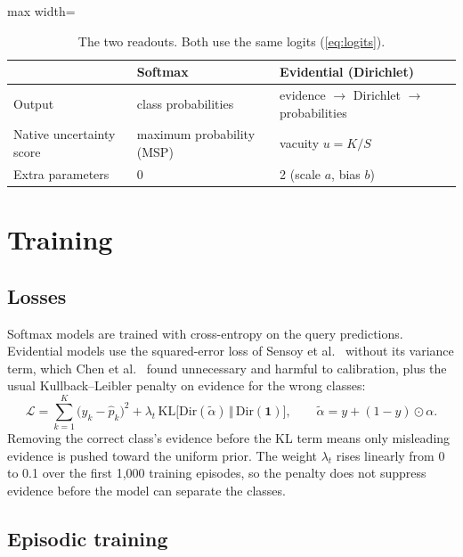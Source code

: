 \begin{table}[H]
\centering
\caption{The two readouts. Both use the same logits (\cref{eq:logits}).}
\label{tab:readouts}
\begin{adjustbox}{max width=\textwidth}
\begin{tabular}{@{}lll@{}}
\toprule
& Softmax & Evidential (Dirichlet) \\
\midrule
Output & class probabilities & evidence $\rightarrow$ Dirichlet $\rightarrow$ probabilities \\
Native uncertainty score & maximum probability (MSP) & vacuity $u = K/S$ \\
Extra parameters & 0 & 2 (scale $a$, bias $b$) \\
\bottomrule
\end{tabular}
\end{adjustbox}
\end{table}

\section{Training}
\label{sec:training}

\subsection{Losses}
\label{sec:edl-loss}

Softmax models are trained with cross-entropy on the query predictions. Evidential models use the
squared-error loss of Sensoy et al.~\cite{sensoy2018edl} without its variance term, which Chen et
al.~\cite{chen2024redl} found unnecessary and harmful to calibration, plus the usual Kullback--Leibler
penalty on evidence for the wrong classes:
\begin{equation}
\mathcal{L} = \sum_{k=1}^{K} \bigl(y_k - \hat p_k\bigr)^2 + \lambda_t\, \mathrm{KL}\bigl[\mathrm{Dir}(\tilde\alpha)\,\Vert\,\mathrm{Dir}(\mathbf{1})\bigr],
\qquad \tilde\alpha = y + (1 - y) \odot \alpha .
\end{equation}
Removing the correct class's evidence before the KL term means only misleading evidence is pushed toward
the uniform prior. The weight $\lambda_t$ rises linearly from 0 to 0.1 over the first 1,000 training
episodes, so the penalty does not suppress evidence before the model can separate the classes.

\subsection{Episodic training}

